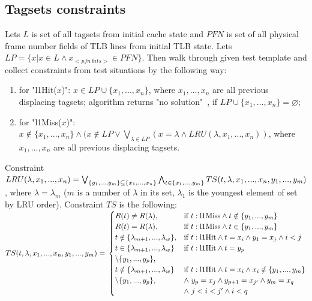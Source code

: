 \documentclass[times, 10pt,twocolumn]{article}
\begin{document}
\subsection{Tagsets constraints}
Lets $L$ is set of all tagsets from initial cache state and $PFN$ is
set of all physical frame number fields of TLB lines from initial
TLB state. Lets $LP = \{ x | x \in L \wedge x_{<pfn~bits>} \in
PFN\}$. Then walk through given test template and collect
constraints from test situations by the following way:
\begin{enumerate} \item for "l1Hit($x$)": $x \in LP \cup \{ x_1,
..., x_n \}$, where $x_1, ..., x_n$ are all previous displacing
tagsets; algorithm returns "no solution"\ , if $LP \cup \{ x_1, ...,
x_n \} = \varnothing$; \item for "l1Miss($x$)": $x \notin \{x_1,
..., x_n \} \wedge (x \notin LP \vee \bigvee_{\lambda \in LP} (x =
\lambda \wedge LRU(\lambda, x_1, ..., x_n))$, where $x_1, ..., x_n$
are all previous displacing tagsets. \end{enumerate}

Constraint $LRU(\lambda, x_1, ..., x_n) = \bigvee_{\{y_1, ..., y_m\} \subseteq \{x_1, ..., x_n\}} \bigwedge_{t \in \{x_1, ..., y_m\}}  TS(t, \lambda, x_1, ..., x_n,\\y_1, ..., y_m)$, where $\lambda = \lambda_m$ ($m$ is a number of $\lambda$ in its set, $\lambda_1$ is the youngest element of set by LRU order). Constraint $TS$ is the following:\\
$TS(t, \lambda, x_1, ..., x_n, y_1, ..., y_m) = \\
\begin{cases}
R(t) \neq R(\lambda),&\text{if~} t:\text{l1Miss} \wedge t \notin \{y_1, ..., y_m\}\\
R(t) = R(\lambda),&\text{if~} t:\text{l1Miss} \wedge t \in \{y_1, ..., y_m\}\\
t \notin \{\lambda_{m+1}, ..., \lambda_w\},&\text{if~} t:\text{l1Hit} \wedge t = x_i \wedge y_1 = x_j \wedge i < j\\
t \in \{\lambda_{m+1}, ..., \lambda_w\}&\text{if~} t:\text{l1Hit} \wedge t = y_p\\ \setminus\{y_1, ..., y_p\},\\
t \notin \{\lambda_{m+1}, ..., \lambda_w\}&\text{if~} t:\text{l1Hit} \wedge t = x_i \wedge x_i \notin \{y_1, ..., y_m\}\\ \setminus\{y_1, ..., y_p\},& \wedge~y_p = x_j \wedge y_{p+1} = x_{j'} \wedge y_m = x_q\\& \wedge~j < i < j' \wedge i < q \\
\end{cases}$
\end{document}
